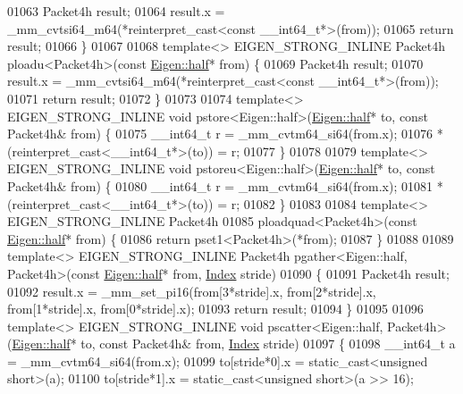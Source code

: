 \begin{DoxyCode}
01063   Packet4h result;
01064   result.x = \_mm\_cvtsi64\_m64(*reinterpret\_cast<const \_\_int64\_t*>(from));
01065   \textcolor{keywordflow}{return} result;
01066 \}
01067 
01068 \textcolor{keyword}{template}<> EIGEN\_STRONG\_INLINE Packet4h ploadu<Packet4h>(\textcolor{keyword}{const} \hyperlink{struct_eigen_1_1half}{Eigen::half}* from) \{
01069   Packet4h result;
01070   result.x = \_mm\_cvtsi64\_m64(*reinterpret\_cast<const \_\_int64\_t*>(from));
01071   \textcolor{keywordflow}{return} result;
01072 \}
01073 
01074 \textcolor{keyword}{template}<> EIGEN\_STRONG\_INLINE \textcolor{keywordtype}{void} pstore<Eigen::half>(\hyperlink{struct_eigen_1_1half}{Eigen::half}* to, \textcolor{keyword}{const} Packet4h& from) \{
01075   \_\_int64\_t r = \_mm\_cvtm64\_si64(from.x);
01076   *(\textcolor{keyword}{reinterpret\_cast<}\_\_int64\_t*\textcolor{keyword}{>}(to)) = r;
01077 \}
01078 
01079 \textcolor{keyword}{template}<> EIGEN\_STRONG\_INLINE \textcolor{keywordtype}{void} pstoreu<Eigen::half>(\hyperlink{struct_eigen_1_1half}{Eigen::half}* to, \textcolor{keyword}{const} Packet4h& from) 
      \{
01080   \_\_int64\_t r = \_mm\_cvtm64\_si64(from.x);
01081   *(\textcolor{keyword}{reinterpret\_cast<}\_\_int64\_t*\textcolor{keyword}{>}(to)) = r;
01082 \}
01083 
01084 \textcolor{keyword}{template}<> EIGEN\_STRONG\_INLINE Packet4h
01085 ploadquad<Packet4h>(\textcolor{keyword}{const} \hyperlink{struct_eigen_1_1half}{Eigen::half}* from) \{
01086   \textcolor{keywordflow}{return} pset1<Packet4h>(*from);
01087 \}
01088 
01089 \textcolor{keyword}{template}<> EIGEN\_STRONG\_INLINE Packet4h pgather<Eigen::half, Packet4h>(\textcolor{keyword}{const} 
      \hyperlink{struct_eigen_1_1half}{Eigen::half}* from, \hyperlink{namespace_eigen_a62e77e0933482dafde8fe197d9a2cfde}{Index} stride)
01090 \{
01091   Packet4h result;
01092   result.x = \_mm\_set\_pi16(from[3*stride].x, from[2*stride].x, from[1*stride].x, from[0*stride].x);
01093   \textcolor{keywordflow}{return} result;
01094 \}
01095 
01096 \textcolor{keyword}{template}<> EIGEN\_STRONG\_INLINE \textcolor{keywordtype}{void} pscatter<Eigen::half, Packet4h>(\hyperlink{struct_eigen_1_1half}{Eigen::half}* to, \textcolor{keyword}{const} 
      Packet4h& from, \hyperlink{namespace_eigen_a62e77e0933482dafde8fe197d9a2cfde}{Index} stride)
01097 \{
01098   \_\_int64\_t a = \_mm\_cvtm64\_si64(from.x);
01099   to[stride*0].x = \textcolor{keyword}{static\_cast<}\textcolor{keywordtype}{unsigned} \textcolor{keywordtype}{short}\textcolor{keyword}{>}(a);
01100   to[stride*1].x = \textcolor{keyword}{static\_cast<}\textcolor{keywordtype}{unsigned} \textcolor{keywordtype}{short}\textcolor{keyword}{>}(a >> 16);

\end{DoxyCode}

